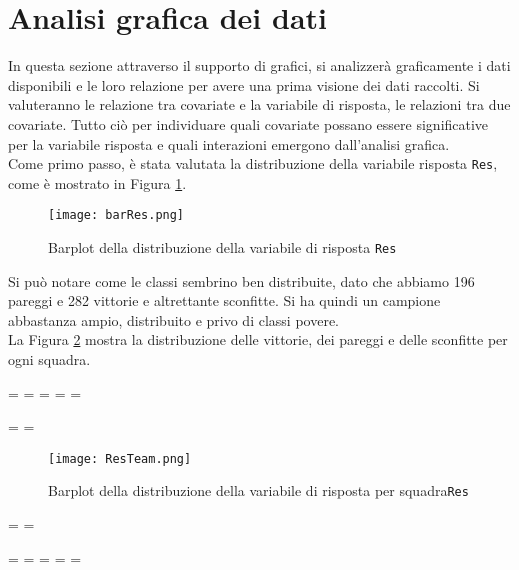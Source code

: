 \section{Analisi grafica dei dati}
In questa sezione attraverso il supporto di grafici, si analizzerà graficamente i dati disponibili e le loro relazione per avere una prima visione dei dati raccolti. Si valuteranno le relazione tra covariate e la variabile di risposta, le relazioni tra due covariate. Tutto ciò per individuare quali covariate possano essere significative per la variabile risposta e quali interazioni emergono dall'analisi grafica.\\

Come primo passo, è stata valutata la distribuzione della variabile risposta \texttt{Res}, come è mostrato in Figura \ref{fig:res}.

\begin{figure}[htbp]
	\begin{center}
		\texttt{[image: barRes.png]}
		\caption{Barplot della distribuzione della variabile di risposta \texttt{Res}} \label{fig:res}
	\end{center}
\end{figure}

Si può notare come le classi sembrino ben distribuite, dato che abbiamo 196 pareggi e 282 vittorie e altrettante sconfitte. Si ha quindi un campione abbastanza ampio, distribuito e privo di classi povere.\\

 La Figura \ref{fig:team} mostra la distribuzione delle vittorie, dei pareggi e delle sconfitte per ogni squadra.

\newpage
\paperwidth=\pdfpageheight
\paperheight=\pdfpagewidth
\pdfpageheight=\paperheight
\pdfpagewidth=\paperwidth
\headwidth=\textheight

\begingroup 
\vsize=\textwidth
\hsize=\textheight


\pagestyle{empty}
\begin{figure}[htbp]
	\begin{center}
		\texttt{[image: ResTeam.png]}
		\caption{Barplot della distribuzione della variabile di risposta per squadra\texttt{Res}} \label{fig:team}
	\end{center}
\end{figure}

\textwidth=\hsize
\textheight=\vsize

\endgroup
\newpage
\paperwidth=\pdfpageheight
\paperheight=\pdfpagewidth
\pdfpageheight=\paperheight
\pdfpagewidth=\paperwidth
\headwidth=\textwidth



